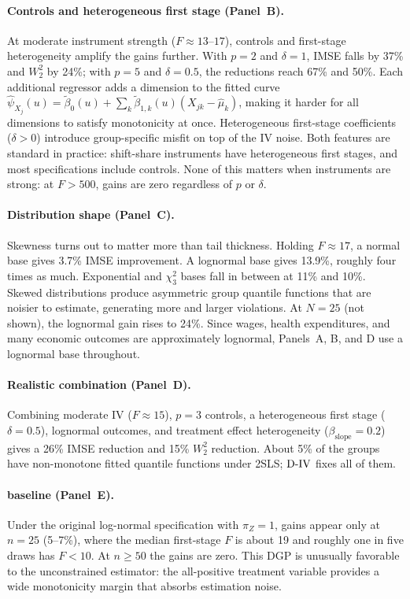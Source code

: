 \documentclass[12pt]{article}
\newcommand{\est}{\ensuremath{\textnormal{D-IV}}\xspace}
\begin{document}
\paragraph{Controls and heterogeneous first stage (Panel~B).} At moderate instrument strength ($F \approx 13$--$17$), controls and first-stage heterogeneity amplify the gains further. With $p = 2$ and $\delta = 1$, IMSE falls by 37\% and $W_2^2$ by 24\%; with $p = 5$ and $\delta = 0.5$, the reductions reach 67\% and 50\%. Each additional regressor adds a dimension to the fitted curve $\hat{\psi}_{X_j}(u) = \tilde{\beta}_0(u) + \sum_k \tilde{\beta}_{1,k}(u)(X_{jk} - \hat{\mu}_k)$, making it harder for all dimensions to satisfy monotonicity at once. Heterogeneous first-stage coefficients ($\delta > 0$) introduce group-specific misfit on top of the IV noise. Both features are standard in practice: shift-share instruments have heterogeneous first stages, and most specifications include controls. None of this matters when instruments are strong: at $F > 500$, gains are zero regardless of $p$ or $\delta$.

\paragraph{Distribution shape (Panel~C).} Skewness turns out to matter more than tail thickness. Holding $F \approx 17$, a normal base gives 3.7\% IMSE improvement. A lognormal base gives 13.9\%, roughly four times as much. Exponential and $\chi^2_3$ bases fall in between at 11\% and 10\%. Skewed distributions produce asymmetric group quantile functions that are noisier to estimate, generating more and larger violations. At $N = 25$ (not shown), the lognormal gain rises to 24\%. Since wages, health expenditures, and many economic outcomes are approximately lognormal, Panels~A, B, and D use a lognormal base throughout.

\paragraph{Realistic combination (Panel~D).} Combining moderate IV ($F \approx 15$), $p = 3$ controls, a heterogeneous first stage ($\delta = 0.5$), lognormal outcomes, and treatment effect heterogeneity ($\beta_{\text{slope}} = 0.2$) gives a 26\% IMSE reduction and 15\% $W_2^2$ reduction. About 5\% of the groups have non-monotone fitted quantile functions under 2SLS; \est fixes all of them.

\paragraph{\citealt{melly2025minimum} baseline (Panel~E).} Under the original log-normal specification with $\pi_Z = 1$, gains appear only at $n = 25$ (5--7\%), where the median first-stage $F$ is about 19 and roughly one in five draws has $F < 10$. At $n \geq 50$ the gains are zero. This DGP is unusually favorable to the unconstrained estimator: the all-positive treatment variable provides a wide monotonicity margin that absorbs estimation noise.
\end{document}
